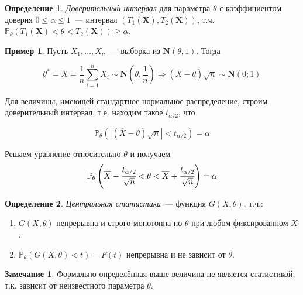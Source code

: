 \documentclass[oneside,final,14pt]{extreport}
\theoremstyle{plain}
\theoremstyle{definition}
\newtheorem*{defn}{Определение}
\newtheorem*{exmp}{Пример}
\newtheorem*{rmrk}{Замечание}
\theoremstyle{named}
\begin{document}
\begin{defn}
{\it Доверительный интервал} для параметра $\theta$ с коэффициентом доверия $0 \leqslant \alpha \leqslant 1$~--- интервал $(T_1(\mathbf{X}), T_2(\mathbf{X}))$, т.ч. $\mathbb{P}_{\theta}(T_1(\mathbf{X}) < \theta < T_2(\mathbf{X})) \geqslant \alpha$.
\end{defn}

\begin{exmp}
Пусть $X_1, \ldots, X_n$~--- выборка из $\mathbf{N}(\theta, 1)$. Тогда

\begin{equation*}
    \theta^{*}
    = \overline{X}
    = \frac{1}{n} \sum\limits_{i=1}^{n} X_{i} \sim \mathbf{N}\left(\theta, \frac{1}{n}\right)
    \Rightarrow (\overline{X}-\theta) \sqrt{n} \sim \mathbf{N}(0;1)
\end{equation*}

Для величины, имеющей стандартное нормальное распределение, строим доверительный интервал, т.е. находим такое $t_{\alpha / 2}$, что 

\begin{equation*}
    \mathbb{P}_{\theta}\left(|(\overline{X}-\theta) \sqrt{n}|<t_{\alpha / 2}\right)=\alpha
\end{equation*}

Решаем уравнение относительно $\theta$ и получаем
\begin{equation*}
    \mathbb{P}_{\theta}\left(\overline{X}-\cfrac{t_{\alpha / 2}}{\sqrt{n}}<\theta<\overline{X}+\cfrac{t_{\alpha / 2}}{\sqrt{n}}\right)=\alpha 
\end{equation*}

\end{exmp}

\begin{defn}
{\it Центральная статистика}~--- функция $G(X,\theta)$, т.ч.:
\begin{enumerate}
    \item $G(X,\theta)$ непрерывна и строго монотонна по $\theta$ при любом фиксированном $X$.
    \item $\mathbb{P}_{\theta}(G(X, \theta)<t)=F(t)$ непрерывна и не зависит от $\theta$.
\end{enumerate}
\end{defn}

\begin{rmrk}
Формально определённая выше величина не является статистикой, т.к. зависит от неизвестного параметра $\theta$.
\end{rmrk}
\end{document}
